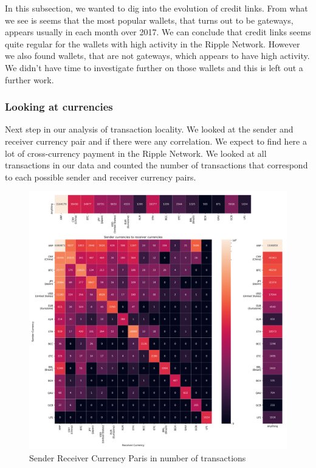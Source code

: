 In this subsection, we wanted to dig into the evolution of credit links. From what we see is seems that the most popular wallets, that turns out to be gateways, appears usually in each month over 2017. We can conclude that credit links seems quite regular for the wallets with high activity in the Ripple Network. However we also found wallets, that are not gateways, which appears to have high activity. We didn't have time to investigate further on those wallets and this is left out a further work.
\newpage
\subsubsection{Looking at currencies}
Next step in our analysis of transaction locality. We looked at the sender and receiver currency pair and if there were any correlation. We expect to find here a lot of cross-currency payment in the Ripple Network. We looked at all transactions in our data and counted the number of transactions that correspond to each possible sender and receiver currency pairs.
\begin{figure}[h!]
    \centering
    \includegraphics[width = \linewidth]{sender_to_receiver_heatmap.png}
    \caption{Sender Receiver Currency Paris in number of transactions}
    \label{fig:heatmapNbTxns}
\end{figure}

